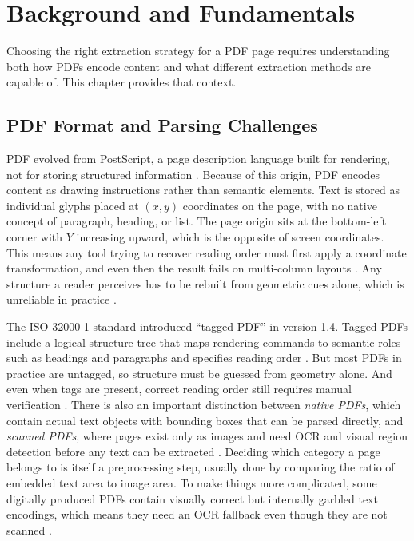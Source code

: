 \chapter{Background and Fundamentals}

Choosing the right extraction strategy for a PDF page requires understanding
both how PDFs encode content and what different extraction methods are capable
of. This chapter provides that context.

\section{PDF Format and Parsing Challenges}

PDF evolved from PostScript, a page description language built for rendering,
not for storing structured information \autocite{whitington2012}. Because of this
origin, PDF encodes content as drawing instructions rather than semantic
elements. Text is stored as individual glyphs placed at $(x, y)$ coordinates
on the page, with no native concept of paragraph, heading, or list. The page
origin sits at the bottom-left corner with $Y$ increasing upward, which is the
opposite of screen coordinates. This means any tool trying to recover reading
order must first apply a coordinate transformation, and even then the result
fails on multi-column layouts \autocite{whitington2012}. Any structure a reader
perceives has to be rebuilt from geometric cues alone, which is unreliable in
practice \autocite{gao2011}.

The ISO 32000-1 standard introduced ``tagged PDF'' in version 1.4. Tagged PDFs
include a logical structure tree that maps rendering commands to semantic roles
such as headings and paragraphs and specifies reading order
\autocite{darvishy2018}. But most PDFs in practice are untagged, so structure must
be guessed from geometry alone. And even when tags are present, correct reading
order still requires manual verification \autocite{darvishy2018}. There is also an
important distinction between \textit{native PDFs}, which contain actual text
objects with bounding boxes that can be parsed directly, and \textit{scanned
PDFs}, where pages exist only as images and need OCR and visual region detection
before any text can be extracted \autocite{whitington2012}. Deciding which category a
page belongs to is itself a preprocessing step, usually done by comparing the
ratio of embedded text area to image area. To make things more complicated,
some digitally produced PDFs contain visually correct but internally garbled
text encodings, which means they need an OCR fallback even though they are not
scanned \autocite{whitington2012}.

